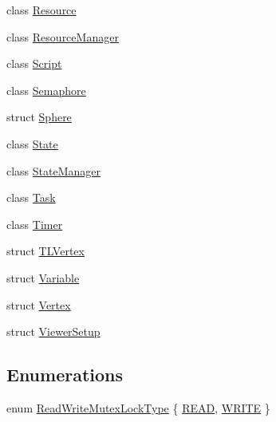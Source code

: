 \begin{DoxyCompactItemize}
\item 
class \hyperlink{classmage_1_1_resource}{Resource}
\item 
class \hyperlink{classmage_1_1_resource_manager}{Resource\+Manager}
\item 
class \hyperlink{classmage_1_1_script}{Script}
\item 
class \hyperlink{classmage_1_1_semaphore}{Semaphore}
\item 
struct \hyperlink{structmage_1_1_sphere}{Sphere}
\item 
class \hyperlink{classmage_1_1_state}{State}
\item 
class \hyperlink{classmage_1_1_state_manager}{State\+Manager}
\item 
class \hyperlink{classmage_1_1_task}{Task}
\item 
class \hyperlink{classmage_1_1_timer}{Timer}
\item 
struct \hyperlink{structmage_1_1_t_l_vertex}{T\+L\+Vertex}
\item 
struct \hyperlink{structmage_1_1_variable}{Variable}
\item 
struct \hyperlink{structmage_1_1_vertex}{Vertex}
\item 
struct \hyperlink{structmage_1_1_viewer_setup}{Viewer\+Setup}
\end{DoxyCompactItemize}
\subsection*{Enumerations}
\begin{DoxyCompactItemize}
\item 
enum \hyperlink{namespacemage_afd76fcca37ce5c5b2227671290973c74}{Read\+Write\+Mutex\+Lock\+Type} \{ \hyperlink{namespacemage_afd76fcca37ce5c5b2227671290973c74a384918b13691984406aeb754f1c454d0}{R\+E\+AD}, 
\hyperlink{namespacemage_afd76fcca37ce5c5b2227671290973c74aff9d196f4bda4079f3f1ce90bd644662}{W\+R\+I\+TE}
 \}
\end{DoxyCompactItemize}
